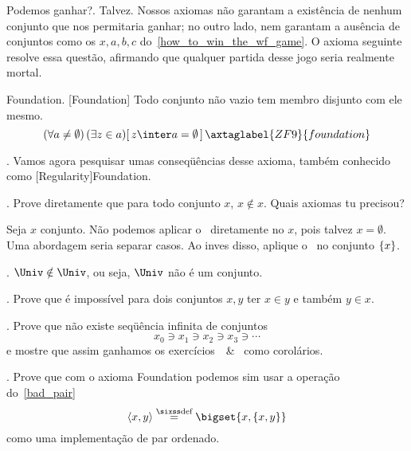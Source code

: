\note Podemos ganhar?.
Talvez.  Nossos axiomas não garantam a existência de nenhum conjunto
que nos permitaria ganhar; no outro lado, nem garantam a ausência de
conjuntos como os $x,a,b,c$ do~\ref{how_to_win_the_wf_game}.
O axioma seguinte resolve essa questão, afirmando que qualquer partida
desse jogo seria realmente mortal.

\axiom Foundation.
[Foundation]%
\label{foundation}%
Todo conjunto não vazio tem membro disjunto com ele mesmo.
$$
\paren{\forall a\neq\emptyset}
\lexists {z \in a} {z\inter a = \emptyset}
\axtaglabel{ZF9}{foundation}
$$

\blah.
Vamos agora pesquisar umas conseqüências desse axioma, também conhecido como
[Regularity]{Foundation}.

\exercise.
\label{x_notin_x}%
Prove diretamente que para todo conjunto $x$, $x\notin x$.
Quais axiomas tu precisou?

\hint
Seja $x$ conjunto.
Não podemos aplicar o~ diretamente no $x$,
pois talvez $x = \emptyset$.
Uma abordagem seria separar casos.
Ao inves disso, aplique o~ no conjunto $\left\{x\right\}$.

\endexercise

\corollary.
\label{unit_not_in_univ}
$\Univ\notin\Univ$, ou seja, $\Univ$ não é um conjunto.

\exercise.
\label{x_y_cannot_belong_to_each_other}%
Prove que é impossível para dois conjuntos $x,y$ ter
$x \in y$ e também $y \in x$.

\endexercise

\exercise.
\label{no_infinite_in_descending_chain_of_sets}%
Prove que não existe seqüência infinita de conjuntos
$$
x_0 \ni x_1 \ni x_2 \ni x_3 \ni \dotsb
$$
e mostre que assim ganhamos os
exercícios~~\&~
como corolários.

\endexercise

\exercise.
\label{bad_pair_becomes_good_pair}%
Prove que com o axioma Foundation podemos sim usar a operação
do~\ref{bad_pair}
$$
\tup{x,y} \defeq \bigset{ x, \set{x, y} }
$$
como uma implementação de par ordenado.

\endexercise

